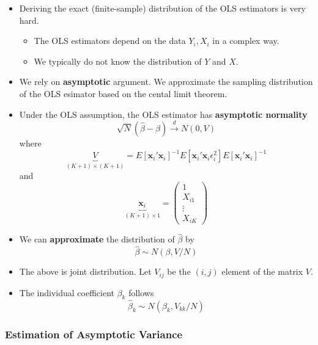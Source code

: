 \documentclass[]{book}
\providecommand{\tightlist}{%
  \setlength{\itemsep}{0pt}\setlength{\parskip}{0pt}}
\begin{document}
\begin{itemize}
\tightlist
\item
  Deriving the exact (finite-sample) distribution of the OLS estimators
  is very hard.

  \begin{itemize}
  \tightlist
  \item
    The OLS estimators depend on the data \(Y_i, X_i\) in a complex way.
  \item
    We typically do not know the distribution of \(Y\) and \(X\).
  \end{itemize}
\item
  We rely on \textbf{asymptotic} argument. We approximate the sampling
  distribution of the OLS esimator based on the cental limit theorem.
\item
  Under the OLS assumption, the OLS estimator has \textbf{asymptotic
  normality} \[
  \sqrt{N}(\hat{\beta}-\beta)\overset{d}{\rightarrow}N\left(0,V \right)    
  \] where \[
  \underbrace{V}_{(K+1)\times(K+1)}
   = E[\mathbf{x}_{i}'\mathbf{x}_{i}]^{-1}E[\mathbf{x}_{i}'\mathbf{x}_{i}\epsilon_{i}^{2}]E[\mathbf{x}_{i}'\mathbf{x}_{i}]^{-1}
  \] and \[
  \underbrace{\mathbf{x}_{i}}_{(K+1)\times1}=\left(\begin{array}{c}
  1\\
  X_{i1}\\
  \vdots\\
  X_{iK}
  \end{array}\right)
  \]
\item
  We can \textbf{approximate} the distribution of \(\hat{\beta}\) by \[
  \hat{\beta} \sim N(\beta, V / N)
  \]
\item
  The above is joint distribution. Let \(V_{ij}\) be the \((i,j)\)
  element of the matrix \(V\).
\item
  The individual coefficient \(\beta_k\) follows \[
   \hat\beta_k \sim N(\beta_k, V_{kk} / N )
  \]
\end{itemize}

\subsubsection{Estimation of Asymptotic
Variance}\label{estimation-of-asymptotic-variance}
\end{document}
